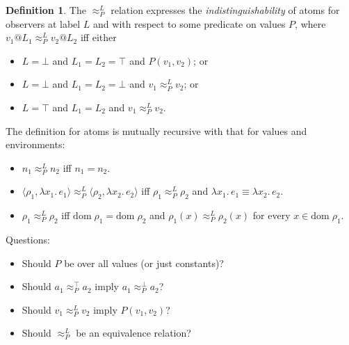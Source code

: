 \documentclass{article}
\makeatletter
\newcommand{\at}{\ensuremath{{\scriptstyle{@}}}}
\theoremstyle{definition}
\newtheorem{definition}{Definition}
\makeatother
\begin{document}
\begin{definition}
  The $\approx^{L}_{P}$ relation expresses the \emph{indistinguishability} of
  atoms for observers at label $L$ and with respect to some predicate on values
  $P$, where $v_1 \at L_1 \approx^{L}_{P} v_2 \at L_2$ iff either
  \begin{itemize}
  \item $L = \bot$ and
    $L_1 = L_2 = \top$ and $P(v_1, v_2)$; or
  \item $L = \bot$ and
    $L_1 = L_2 = \bot$ and $v_1 \approx^{L}_{P} v_2$; or
  \item $L = \top$ and $L_1 = L_2$ and $v_1 \approx^{L}_{P} v_2$.
  \end{itemize}
  The definition for atoms is mutually recursive with that for values and
  environments:
  \begin{itemize}
  \item $n_1 \approx^{L}_{P} n_2$ iff $n_1 = n_2$.
  \item
    $\langle{\rho_1, \lambda{x_1}.\, e_1\rangle} \approx^{L}_{P}
    \langle{\rho_2, \lambda{x_2}.\, e_2\rangle}$ iff
    $\rho_1 \approx^{L}_{P} \rho_2$ and
    $\lambda{x_1}.\, e_1 \equiv \lambda{x_2}.\, e_2$.
  \item $\rho_1 \approx^{L}_{P} \rho_2$ iff
    $\mathrm{dom}\; \rho_1 = \mathrm{dom}\; \rho_2$ and
    $\rho_1(x) \approx^{L}_{P} \rho_2(x)$ for every
    $x \in \mathrm{dom}\; \rho_1$.
  \end{itemize}
  \label{def:indistinguishability}
\end{definition}

\begin{flushleft}
  Questions:
\end{flushleft}

\begin{itemize}
\item Should $P$ be over all values (or just constants)?
\item Should $a_1 \approx^{\top}_{P} a_2$ imply $a_1 \approx^{\bot}_{P} a_2$?
\item Should $v_1 \approx^{L}_{P} v_2$ imply $P(v_1,v_2)$?
\item Should $\approx^{L}_{P}$ be an equivalence relation?
\end{itemize}
\end{document}
